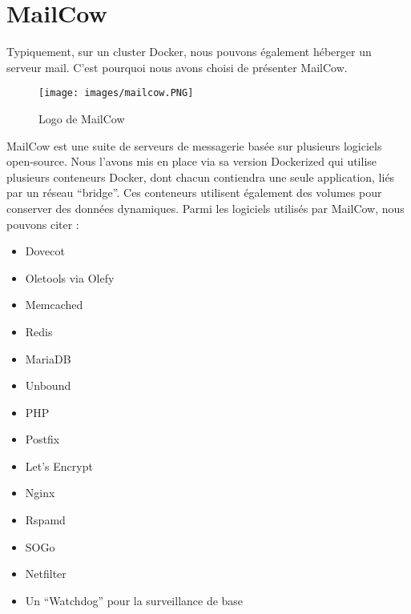 \documentclass[oneside,12pt]{report}
\begin{document}
\newpage

\section{MailCow}

Typiquement, sur un cluster Docker, nous pouvons également héberger un serveur mail. C'est pourquoi nous avons choisi de présenter MailCow.

\begin{figure}[H]
    \centering
    \texttt{[image: images/mailcow.PNG]}
    \caption{Logo de MailCow}
    \label{fig:mesh1}
\end{figure}

MailCow est une suite de serveurs de messagerie basée sur plusieurs logiciels open-source. Nous l'avons mis en place via sa version Dockerized qui utilise plusieurs conteneurs Docker, dont chacun contiendra une seule application, liés par un réseau “bridge”. Ces conteneurs utilisent également des volumes pour conserver des données dynamiques. Parmi les logiciels utilisés par MailCow, nous pouvons citer :

\begin{itemize}

    \item Dovecot
    
    \item Oletools via Olefy
    
    \item Memcached
    
    \item Redis

    \item MariaDB

    \item Unbound
    
    \item PHP
    
    \item Postfix
    
    \item Let's Encrypt

    \item Nginx

    \item Rspamd
    
    \item SOGo
    
    \item Netfilter
    
    \item Un “Watchdog” pour la surveillance de base

\end{itemize} \newline
\end{document}
